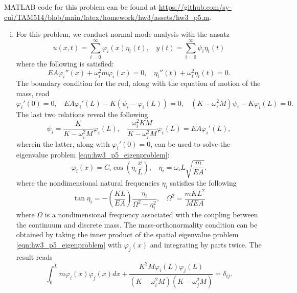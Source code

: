 MATLAB code for this problem can be found at \url{https://github.com/sy-cui/TAM514/blob/main/latex/homework/hw3/assets/hw3_p5.m}.

\begin{enumerate}[(i)]
\item {
    For this problem, we conduct normal mode analysis with the ansatz 
    \begin{equation}
        u(x, t) = \sum_{i=0}^\infty \varphi_i(x) \eta_i(t), ~~~~ y(t) = \sum_{i=0}^\infty \psi_i \eta_i(t)
    \end{equation}
    where the following is satisfied:
    \begin{equation}\label{eqn:hw3_p5_eigenproblem}
        EA \varphi_i''(x) + \omega_i^2 m \varphi_i(x) = 0, ~~~~ \eta_i''(t) + \omega_i^2 \eta_i(t) = 0.
    \end{equation}
    The boundary condition for the rod, along with the equation of motion of the mass, read 
    \begin{equation}\label{eqn:hw3_p5_bc_1}
        \varphi_i'(0) = 0, ~~~~ EA \varphi_i'(L) - K(\psi_i - \varphi_i(L)) = 0, ~~~~ (K - \omega_i^2 M) \psi_i - K\varphi_i(L) = 0.
    \end{equation}
    The last two relations reveal the following
    \begin{equation}\label{eqn:hw3_p5_bc_2}
        \psi_i = \frac{K}{K - \omega_i^2 M} \varphi_i(L), ~~~~ \frac{\omega_i^2 KM}{K - \omega_i^2 M} \varphi_i(L) = EA \varphi_i'(L),
    \end{equation}
    wherein the latter, along with $\varphi_i'(0) = 0$, can be used to solve the eigenvalue problem \cref{eqn:hw3_p5_eigenproblem}:
    \begin{equation}\label{eqn:hw3_p5_eigenfunction}
        \boxed{\varphi_i(x) = C_i \cos\left(\eta_i \frac{x}{L}\right), ~~~~ \eta_i = \omega_i L \sqrt{\frac{m}{EA}}}.
    \end{equation}
    where the nondimensional natural frequencies $\eta_i$ satisfies the following 
    \begin{equation}\label{eqn:hw3_p5_eval_eqn}
        \tan \eta_i = - \left(\frac{KL}{EA}\right) \frac{\eta_i}{\Omega^2 - \eta_i^2}, ~~~~ \Omega^2 = \frac{mKL^2}{MEA}
    \end{equation}
    where $\Omega$ is a nondimensional frequency associated with the coupling between the continuum and discrete mass. 
    The mass-orthonormality condition can be obtained by taking the inner product of the spatial eigenvalue problem \cref{eqn:hw3_p5_eigenproblem} with $\varphi_j(x)$ and integrating by parts twice. 
    The result reads 
    \begin{equation}\label{eqn:hw3_p5_mass_orthonormality}
        \int_0^L m \varphi_i(x) \varphi_j(x) dx + \frac{K^2M \varphi_i(L) \varphi_j(L)}{(K - \omega_i^2 M)(K - \omega_j^2 M)} = \delta_{ij}.
    \end{equation}   
    
}
\end{enumerate}
